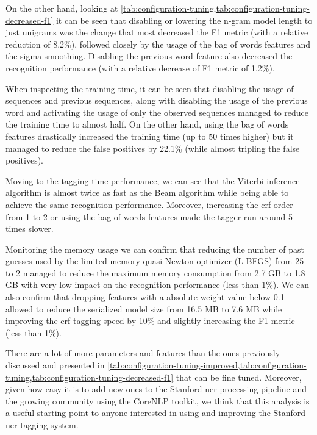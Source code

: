 On the other hand, looking at \cref{tab:configuration-tuning,tab:configuration-tuning-decreased-f1} it can be seen that disabling or lowering the n-gram model length to just unigrams was the change that most decreased the F1 metric (with a relative reduction of 8.2\%), followed closely by the usage of the bag of words features and the sigma smoothing. Disabling the previous word feature also decreased the recognition performance (with a relative decrease of F1 metric of 1.2\%).

When inspecting the training time, it can be seen that disabling the usage of sequences and previous sequences, along with disabling the usage of the previous word and activating the usage of only the observed sequences managed to reduce the training time to almost half. On the other hand, using the bag of words features drastically increased the training time (up to 50 times higher) but it managed to reduce the false positives by 22.1\% (while almost tripling the false positives).

Moving to the tagging time performance, we can see that the Viterbi inference algorithm is almost twice as fast as the Beam algorithm while being able to achieve the same recognition performance. Moreover, increasing the \gls{crf} order from 1 to 2 or using the bag of words features made the tagger run around 5 times slower.

Monitoring the memory usage we can confirm that reducing the number of past guesses used by the limited memory quasi Newton optimizer (L-BFGS) from 25 to 2 managed to reduce the maximum memory consumption from 2.7 GB to 1.8 GB with very low impact on the recognition performance (less than 1\%). We can also confirm that dropping features with a absolute weight value below 0.1 allowed to reduce the serialized model size from 16.5 MB to 7.6 MB while improving the \gls{crf} tagging speed by 10\% and slightly increasing the F1 metric (less than 1\%).

There are a lot of more parameters and features than the ones previously discussed and presented in \cref{tab:configuration-tuning-improved,tab:configuration-tuning,tab:configuration-tuning-decreased-f1} that can be fine tuned. Moreover, given how easy it is to add new ones to the Stanford \gls{ner} processing pipeline and the growing community using the CoreNLP toolkit, we think that this analysis is a useful starting point to anyone interested in using and improving the Stanford \gls{ner} tagging system.


